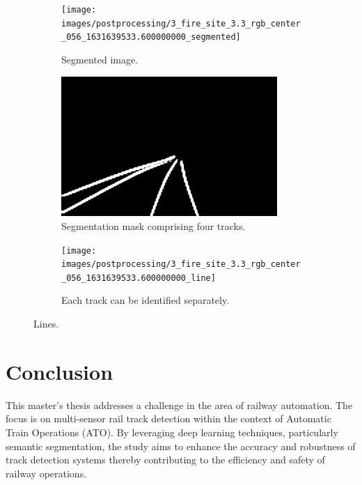 \documentclass[Master,MDS,english]{BASE/twbook} %
\begin{document}
\begin{figure}
\centering
\begin{subfigure}[t]{.33\textwidth}
  \centering
  \texttt{[image: images/postprocessing/3\_fire\_site\_3.3\_rgb\_center\_056\_1631639533.600000000\_segmented]}
  \caption{Segmented image.}
\end{subfigure}%
\begin{subfigure}[t]{.33\textwidth}
  \centering
  \includegraphics[width=0.9\textwidth]{images/postprocessing/3_fire_site_3.3_rgb_center_056_1631639533.600000000_mask}
  \caption{Segmentation mask comprising four tracks.}
\end{subfigure}%
\begin{subfigure}[t]{.33\textwidth}
  \centering
  \texttt{[image: images/postprocessing/3\_fire\_site\_3.3\_rgb\_center\_056\_1631639533.600000000\_line]}
  \caption{Each track can be identified separately. }
\end{subfigure}
\caption{Lines. }
\label{fig:postprocessing1}
\end{figure}




\chapter{Conclusion} %

This master's thesis addresses a challenge in the area of railway automation. The focus is on multi-sensor rail track detection within the context of Automatic Train Operations (ATO). By leveraging deep learning techniques, particularly semantic segmentation, the study aims to enhance the accuracy and robustness of track detection systems thereby contributing to the efficiency and safety of railway operations.
\end{document}
